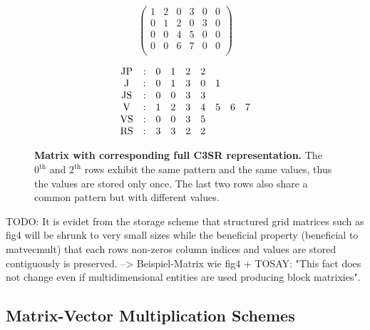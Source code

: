 \documentclass{article}
\begin{document}
    \begin{figure}[ht]
      \centering
      \begin{minipage}{0.4\textwidth}
        \centering
        $$
        \begin{pmatrix}
          1 & 2 & 0 & 3 & 0 & 0 \\
          0 & 1 & 2 & 0 & 3 & 0 \\
          0 & 0 & 4 & 5 & 0 & 0 \\
          0 & 0 & 6 & 7 & 0 & 0 \\
        \end{pmatrix}
        $$
      \end{minipage}
      \begin{minipage}{0.4\textwidth}
        \centering
        $$
        \begin{matrix}
          \JP & : & 0 & 1 & 2 & 2 &   &   &   \\
           \J & : & 0 & 1 & 3 & 0 & 1 &   &   \\
          \JS & : & 0 & 0 & 3 & 3 &   &   &   \\
           \V & : & 1 & 2 & 3 & 4 & 5 & 6 & 7 \\
          \VS & : & 0 & 0 & 3 & 5 &   &   &   \\
          \RS & : & 3 & 3 & 2 & 2 &   &   &   \\
        \end{matrix}
        $$
      \end{minipage}
      \caption[Matrix with corresponding full C3SR representation.]{\textbf{Matrix with corresponding full C3SR representation.} The $0^{\text{th}}$ and $2^{\text{th}}$ rows exhibit the same pattern and the same values, thus the values are stored only once. The last two rows also share a common pattern but with different values.}
      \label{fig:c3sr_example_full}
    \end{figure}

    TODO: It is evidet from the storage scheme that structured grid matrices such as fig4 will be shrunk to very small sizes while the beneficial property (beneficial to matvecmult) that each rows non-zeros column indices and values are stored contiguously is preserved. --> Beispiel-Matrix wie fig4 + TOSAY: "This fact does not change even if multidimensional entities are used producing block matrixies".

  \subsection{Matrix-Vector Multiplication Schemes} \label{subsec:matrix-vector-multiplication-schemes}
\end{document}
